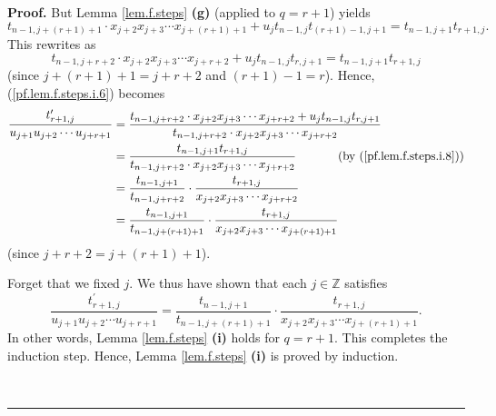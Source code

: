 \documentclass[numbers=enddot,12pt,final,onecolumn,notitlepage]{scrartcl}%
\theoremstyle{definition}
\newenvironment{proof}[1][Proof]{\noindent\textbf{#1.} }{\ \rule{0.5em}{0.5em}}
\newenvironment{verlong}{}{}
\begin{document}
\begin{proof}
\begin{verlong}
But Lemma \ref{lem.f.steps} \textbf{(g)} (applied to $q=r+1$) yields%
\[
t_{n-1,j+\left(  r+1\right)  +1}\cdot x_{j+2}x_{j+3}\cdots x_{j+\left(
r+1\right)  +1}+u_{j}t_{n-1,j}t_{\left(  r+1\right)  -1,j+1}=t_{n-1,j+1}%
t_{r+1,j}.
\]
This rewrites as%
\begin{equation}
t_{n-1,j+r+2}\cdot x_{j+2}x_{j+3}\cdots x_{j+r+2}+u_{j}t_{n-1,j}%
t_{r,j+1}=t_{n-1,j+1}t_{r+1,j} \label{pf.lem.f.steps.i.8}%
\end{equation}
(since $j+\left(  r+1\right)  +1=j+r+2$ and $\left(  r+1\right)  -1=r$).
Hence, (\ref{pf.lem.f.steps.i.6}) becomes%
\begin{align*}
\dfrac{t_{r+1,j}^{\prime}}{u_{j+1}u_{j+2}\cdots u_{j+r+1}}  &  =\dfrac
{t_{n-1,j+r+2}\cdot x_{j+2}x_{j+3}\cdots x_{j+r+2}+u_{j}t_{n-1,j}t_{r,j+1}%
}{t_{n-1,j+r+2}\cdot x_{j+2}x_{j+3}\cdots x_{j+r+2}}\\
&  =\dfrac{t_{n-1,j+1}t_{r+1,j}}{t_{n-1,j+r+2}\cdot x_{j+2}x_{j+3}\cdots
x_{j+r+2}}\ \ \ \ \ \ \ \ \ \ \left(  \text{by (\ref{pf.lem.f.steps.i.8}%
)}\right) \\
&  =\dfrac{t_{n-1,j+1}}{t_{n-1,j+r+2}}\cdot\dfrac{t_{r+1,j}}{x_{j+2}%
x_{j+3}\cdots x_{j+r+2}}\\
&  =\dfrac{t_{n-1,j+1}}{t_{n-1,j+\left(  r+1\right)  +1}}\cdot\dfrac
{t_{r+1,j}}{x_{j+2}x_{j+3}\cdots x_{j+\left(  r+1\right)  +1}}%
\end{align*}
(since $j+r+2=j+\left(  r+1\right)  +1$).

Forget that we fixed $j$. We thus have shown that each $j\in\mathbb{Z}$
satisfies%
\[
\dfrac{t_{r+1,j}^{\prime}}{u_{j+1}u_{j+2}\cdots u_{j+r+1}}=\dfrac{t_{n-1,j+1}%
}{t_{n-1,j+\left(  r+1\right)  +1}}\cdot\dfrac{t_{r+1,j}}{x_{j+2}x_{j+3}\cdots
x_{j+\left(  r+1\right)  +1}}.
\]
In other words, Lemma \ref{lem.f.steps} \textbf{(i)} holds for $q=r+1$. This
completes the induction step. Hence, Lemma \ref{lem.f.steps} \textbf{(i)} is
proved by induction.
\end{verlong}


\end{proof}
\end{document}
